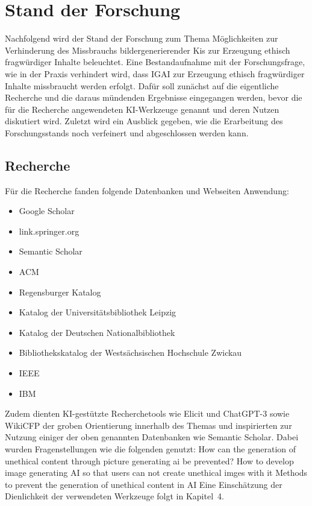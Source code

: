 \chapter{Stand der Forschung}
Nachfolgend wird der Stand der Forschung zum Thema Möglichkeiten zur Verhinderung 
des Missbrauchs bildergenerierender Kis zur Erzeugung ethisch fragwürdiger Inhalte beleuchtet. Eine Bestandaufnahme 
mit der Forschungsfrage, wie in der Praxis verhindert wird, dass IGAI zur Erzeugung ethisch fragwürdiger 
Inhalte missbraucht werden erfolgt. Dafür soll zunächst auf die eigentliche Recherche und die daraus mündenden 
Ergebnisse eingegangen werden, bevor die für die Recherche angewendeten KI-Werkzeuge genannt und deren 
Nutzen diskutiert wird. Zuletzt wird ein Ausblick gegeben, wie die Erarbeitung des Forschungsstands noch 
verfeinert und abgeschlossen werden kann.
\section{Recherche}
Für die Recherche fanden folgende Datenbanken und Webseiten Anwendung:
\begin{itemize}
    \item Google Scholar
    \item link.springer.org
    \item Semantic Scholar
    \item ACM
    \item Regensburger Katalog
    \item Katalog der Universitätsbibliothek Leipzig
    \item Katalog der Deutschen Nationalbibliothek
    \item Bibliothekskatalog der Westsächsischen Hochschule Zwickau
    \item IEEE
    \item IBM    
\end{itemize}

Zudem dienten KI-gestützte Recherchetools wie Elicit und ChatGPT-3 sowie WikiCFP der groben 
Orientierung innerhalb des Themas und inspirierten zur Nutzung einiger der oben genannten 
Datenbanken wie Semantic Scholar. Dabei wurden Fragenstellungen wie die folgenden genutzt:
How can the generation of unethical content through picture generating ai be prevented?
How to develop image generating AI so that users can not create unethical imges with it
Methods to prevent the generation of unethical content in AI
Eine Einschätzung der Dienlichkeit der verwendeten Werkzeuge folgt in Kapitel 4.

